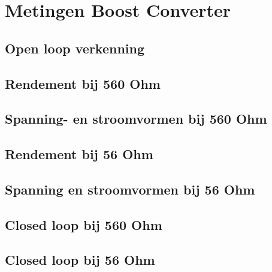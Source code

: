 \section{Metingen Boost Converter}
\subsection{Open loop verkenning}
\subsection{Rendement bij 560 Ohm}
\subsection{Spanning- en stroomvormen bij 560 Ohm}
\subsection{Rendement bij 56 Ohm}
\subsection{Spanning en stroomvormen bij 56 Ohm}
\subsection{Closed loop bij 560 Ohm}
\subsection{Closed loop bij 56 Ohm}